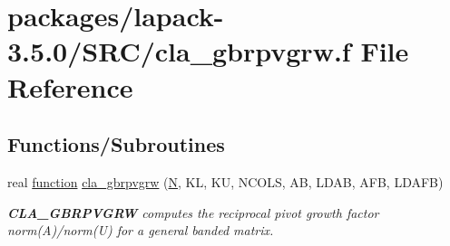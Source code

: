 \hypertarget{cla__gbrpvgrw_8f}{}\section{packages/lapack-\/3.5.0/\+S\+R\+C/cla\+\_\+gbrpvgrw.f File Reference}
\label{cla__gbrpvgrw_8f}
\subsection*{Functions/\+Subroutines}
\begin{DoxyCompactItemize}
\item 
real \hyperlink{afunc_8m_a7b5e596df91eadea6c537c0825e894a7}{function} \hyperlink{group__complexGBcomputational_ga6e2e67de68e0c01598e82430bf7b74d1}{cla\+\_\+gbrpvgrw} (\hyperlink{polmisc_8c_a0240ac851181b84ac374872dc5434ee4}{N}, K\+L, K\+U, N\+C\+O\+L\+S, A\+B, L\+D\+A\+B, A\+F\+B, L\+D\+A\+F\+B)
\begin{DoxyCompactList}\small\item\em {\bfseries C\+L\+A\+\_\+\+G\+B\+R\+P\+V\+G\+R\+W} computes the reciprocal pivot growth factor norm(\+A)/norm(U) for a general banded matrix. \end{DoxyCompactList}\end{DoxyCompactItemize}
